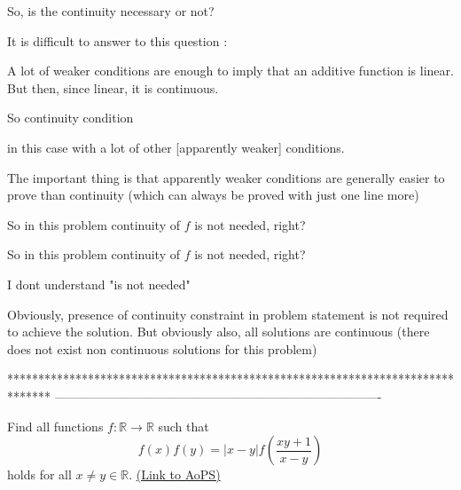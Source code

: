 \begin{solution}
	\begin{tcolorbox}So, is the continuity necessary or not?\end{tcolorbox}
It is difficult to answer to this question :

A lot of weaker conditions are enough to imply that an additive function is linear.
But then, since linear, it is continuous.

So continuity condition  in this case with a lot of other [apparently weaker] conditions.

The important thing is that apparently weaker conditions are generally easier to prove than continuity (which can always be proved with just one line more)



\end{solution}



\begin{solution}
	So in this problem continuity of $f$ is not needed, right?
\end{solution}



\begin{solution}
	\begin{tcolorbox}So in this problem continuity of $f$ is not needed, right?\end{tcolorbox}

I dont understand "is not needed"

Obviously, presence of continuity constraint in problem statement is not required to achieve the solution.
But obviously also, all solutions are continuous (there does not exist non continuous solutions for this problem)
\end{solution}
*******************************************************************************
-------------------------------------------------------------------------------

\begin{problem}
	Find all functions $f:\mathbb{R}\to \mathbb{R}$ such that $$f(x)f(y)=|x-y|f(\frac{xy+1}{x-y})$$ holds for all $x\not=y\in\mathbb{R}$.
	\flushright \href{https://artofproblemsolving.com/community/c6h1594490}{(Link to AoPS)}
\end{problem}



